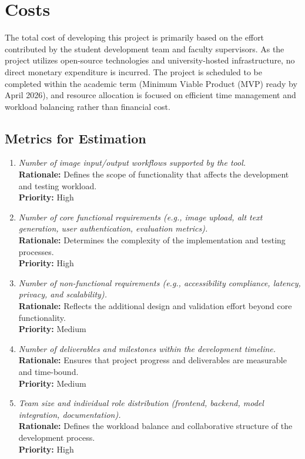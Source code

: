 \documentclass[12pt]{article}
\begin{document}
\section{Costs}

The total cost of developing this project is primarily based on the effort contributed by the student development team and faculty supervisors. As the project utilizes open-source technologies and university-hosted infrastructure, no direct monetary expenditure is incurred. The project is scheduled to be completed within the academic term (Minimum Viable Product (MVP) ready by April 2026), and resource allocation is focused on efficient time management and workload balancing rather than financial cost.

\subsection{Metrics for Estimation}
\begin{enumerate}[label=C-ME \arabic*., wide=0pt, leftmargin=*]
\item \emph{Number of image input/output workflows supported by the tool.}\\[2mm] 
    {\bf Rationale:} Defines the scope of functionality that affects the development and testing workload.\\
    {\bf Priority:} High

\item \emph{Number of core functional requirements (e.g., image upload, alt text generation, user authentication, evaluation metrics).}\\[2mm] 
    {\bf Rationale:} Determines the complexity of the implementation and testing processes.\\
    {\bf Priority:} High

\item \emph{Number of non-functional requirements (e.g., accessibility compliance, latency, privacy, and scalability).}\\[2mm] 
    {\bf Rationale:} Reflects the additional design and validation effort beyond core functionality.\\
    {\bf Priority:} Medium

\item \emph{Number of deliverables and milestones within the development timeline.}\\[2mm] 
    {\bf Rationale:} Ensures that project progress and deliverables are measurable and time-bound.\\
    {\bf Priority:} Medium

\item \emph{Team size and individual role distribution (frontend, backend, model integration, documentation).}\\[2mm] 
    {\bf Rationale:} Defines the workload balance and collaborative structure of the development process.\\
    {\bf Priority:} High
\end{enumerate}
\end{document}
